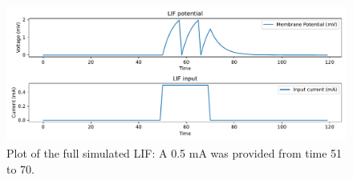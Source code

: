  			
 			
 			\begin{figure}[H]
 				\centering
 				\includegraphics[width=0.5\linewidth]{images/membranePotentialFull}
 				\caption{Plot of the full simulated LIF: A 0.5 mA was provided from time 51 to 70.}
 				\label{fig:membranepotentialfull}
 			\end{figure}
 			
 			
			
			
			
			
			
			
			
			
			
			
			
			
			
			
			




